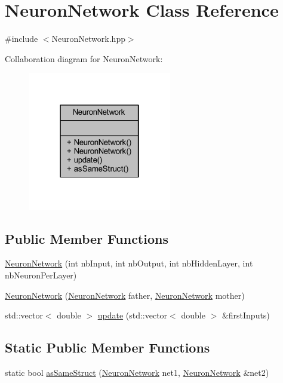 \hypertarget{class_neuron_network}{}\section{Neuron\+Network Class Reference}
\label{class_neuron_network}


{\ttfamily \#include $<$Neuron\+Network.\+hpp$>$}



Collaboration diagram for Neuron\+Network\+:\nopagebreak
\begin{figure}[H]
\begin{center}
\leavevmode
\includegraphics[width=178pt]{class_neuron_network__coll__graph}
\end{center}
\end{figure}
\subsection*{Public Member Functions}
\begin{DoxyCompactItemize}
\item 
\hyperlink{class_neuron_network_a6e952eb34ce626de4031fc750dd87351}{Neuron\+Network} (int nb\+Input, int nb\+Output, int nb\+Hidden\+Layer, int nb\+Neuron\+Per\+Layer)
\item 
\hyperlink{class_neuron_network_a11b1726aee224b3a1d4420f53033862a}{Neuron\+Network} (\hyperlink{class_neuron_network}{Neuron\+Network} father, \hyperlink{class_neuron_network}{Neuron\+Network} mother)
\item 
std\+::vector$<$ double $>$ \hyperlink{class_neuron_network_afbbd6a0533c035b124bab8625d0b70c7}{update} (std\+::vector$<$ double $>$ \&first\+Inputs)
\end{DoxyCompactItemize}
\subsection*{Static Public Member Functions}
\begin{DoxyCompactItemize}
\item 
static bool \hyperlink{class_neuron_network_a0cdba727258e57563916720f2d522fcb}{as\+Same\+Struct} (\hyperlink{class_neuron_network}{Neuron\+Network} net1, \hyperlink{class_neuron_network}{Neuron\+Network} \&net2)
\end{DoxyCompactItemize}


